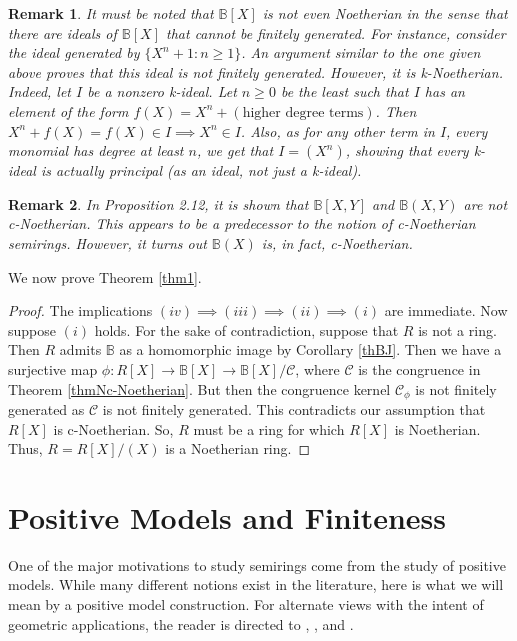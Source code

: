 \documentclass[notitlepage, 10pt]{article}
\theoremstyle{defin}
\theoremstyle{theo}
\theoremstyle{rema}
\newtheorem{rem}{Remark}[section]
\newcommand{\bB}{\mathbb{B}}
\newcommand{\cC}{\mathcal{C}}
\begin{document}
\begin{rem}
    It must be noted that $\bB[X]$ is not even Noetherian in the sense that there are ideals of $\bB[X]$ that cannot be finitely generated. For instance, consider the ideal generated by $\{X^{n}+1 : n\geq 1\}$. An argument similar to the one given above proves that this ideal is not finitely generated. However, it is k-Noetherian. Indeed, let $I$ be a nonzero k-ideal. Let $n\geq 0$ be the least such that $I$ has an element of the form $f(X) = X^n +(\text{higher degree terms})$. Then $X^n+f(X) = f(X)\in I \implies X^n\in I$. Also, as for any other term in $I$, every monomial has degree at least $n$, we get that $I=(X^n)$, showing that every k-ideal is actually principal (as an ideal, not just a k-ideal).
\end{rem}

\begin{rem}
    In \cite{JooMincheva2018} Proposition 2.12, it is shown that $\bB[X,Y]$ and $\bB(X,Y)$ are not c-Noetherian. This appears to be a predecessor to the notion of c-Noetherian semirings. However, it turns out $\bB(X)$ is, in fact, c-Noetherian.
\end{rem}

We now prove Theorem \ref{thm1}.

\thilb*

\begin{proof}
    The implications $(iv)\implies (iii) \implies (ii) \implies (i)$ are immediate. Now suppose $(i)$ holds. For the sake of contradiction, suppose that $R$ is not a ring. Then $R$ admits $\bB$ as a homomorphic image by Corollary \ref{thBJ}. Then we have a surjective map $\phi : R[X] \to \bB[X] \to \bB[X]/\cC$, where $\cC$ is the congruence in Theorem \ref{thmNc-Noetherian}. But then the congruence kernel $\cC_\phi$ is not finitely generated as $\cC$ is not finitely generated. This contradicts our assumption that $R[X]$ is c-Noetherian. So, $R$ must be a ring for which $R[X]$ is Noetherian. Thus, $R = R[X]/(X)$ is a Noetherian ring.
\end{proof}


\section{Positive Models and Finiteness}\label{s7}

One of the major motivations to study semirings come from the study of positive models. While many different notions exist in the literature, here is what we will mean by a positive model construction. For alternate views with the intent of geometric applications, the reader is directed to \cite{borger_jun_semiring}, \cite{FockGoncharov2006}, and \cite{ToenVaquie2009}.
\end{document}
